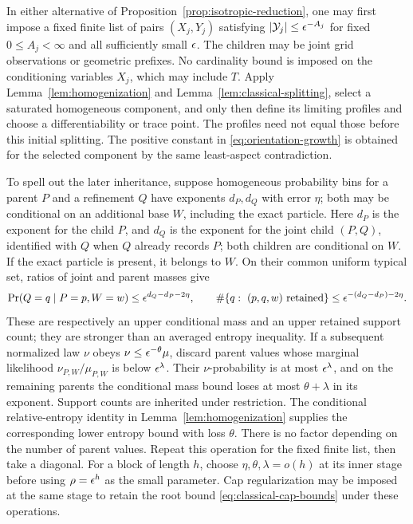 \begin{remark}
\label{rem:classical-profile-inheritance}
In either alternative of Proposition~\ref{prop:isotropic-reduction},
one may first impose a fixed finite list of pairs $(X_j,Y_j)$ satisfying
$|\mathcal Y_j|\le\epsilon^{-A_j}$ for fixed $0\le A_j<\infty$ and all
sufficiently small $\epsilon$.  The children may be joint grid observations
or geometric prefixes.  No cardinality bound is imposed on the
conditioning variables $X_j$, which may include $T$.
  Apply
Lemma~\ref{lem:homogenization} and
Lemma~\ref{lem:classical-splitting}, select a saturated homogeneous
component, and only then define its limiting profiles and choose a
differentiability or trace point.  The profiles need not equal those
before this initial splitting.  The positive constant in
\eqref{eq:orientation-growth} is obtained for the selected component
by the same least-aspect contradiction.

To spell out the later inheritance, suppose homogeneous probability
bins for a parent $P$ and a refinement $Q$ have exponents $d_P,d_Q$
with error $\eta$; both may be conditional on an additional base $W$,
including the exact particle.
Here $d_P$ is the exponent for the child $P$, and $d_Q$ is the exponent
for the joint child $(P,Q)$, identified with $Q$ when $Q$ already records
$P$; both children are conditional on $W$.  If the exact particle is
present, it belongs to $W$.
  On their common uniform typical set,
ratios of joint and parent masses give
\[
 \Pr(Q=q\mid P=p,W=w)
       \le\epsilon^{d_Q-d_P-2\eta},\qquad
 \#\{q:\ (p,q,w)\text{ retained}\}
       \le\epsilon^{-(d_Q-d_P)-2\eta}.
\]
These are respectively an upper conditional mass and an upper retained
support count; they are stronger than an averaged entropy inequality.
If a subsequent normalized law $\nu$ obeys
$\nu\le\epsilon^{-\theta}\mu$, discard parent values whose marginal
likelihood $\nu_{P,W}/\mu_{P,W}$ is below $\epsilon^\lambda$.  Their
$\nu$-probability is at most $\epsilon^\lambda$, and on the remaining
parents the conditional mass bound loses at most $\theta+\lambda$
in its exponent.  Support counts are inherited under restriction.
The conditional relative-entropy identity in
Lemma~\ref{lem:homogenization} supplies the corresponding lower entropy
bound with loss $\theta$.  There is no factor depending on the number
of parent values.  Repeat this operation for the fixed finite list,
then take a diagonal.  For a block of length $h$, choose
$\eta,\theta,\lambda=o(h)$ at its inner stage before using
$\rho=\epsilon^h$ as the small parameter.  Cap regularization may be imposed
at the same stage to retain the root bound
\eqref{eq:classical-cap-bounds} under these operations.
\end{remark}
